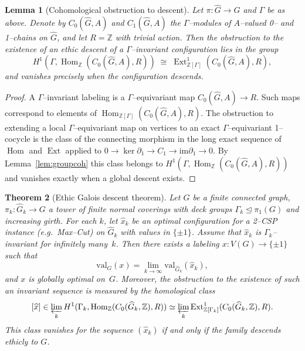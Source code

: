 \documentclass[12pt]{article}
\newcommand{\Hom}{\operatorname{Hom}}
\newcommand{\Ext}{\operatorname{Ext}}
\theoremstyle{plain}
\newtheorem{theorem}{Theorem}[section]
\newtheorem{lemma}[theorem]{Lemma}
\theoremstyle{definition}
\theoremstyle{remark}
\numberwithin{equation}{section}
\begin{document}
\begin{lemma}[Cohomological obstruction to descent]\label{lem:obstruction}
Let $\pi:\widehat G\to G$ and $\Gamma$ be as above.  
Denote by $C_0(\widehat G,A)$ and $C_1(\widehat G,A)$ the $\Gamma$--modules of $A$--valued 0-- and 1--chains on $\widehat G$, and let $R=\mathbb Z$ with trivial action.  
Then the obstruction to the existence of an ethic descent of a $\Gamma$--invariant configuration lies in the group
\[
H^1(\Gamma, \Hom_{\mathbb Z}(C_0(\widehat G,A),R))
\;\cong\;
\Ext^1_{\mathbb Z[\Gamma]}(C_0(\widehat G,A),R),
\]
and vanishes precisely when the configuration descends.
\end{lemma}

\begin{proof}
A $\Gamma$--invariant labeling is a $\Gamma$--equivariant map $C_0(\widehat G,A)\to R$.  
Such maps correspond to elements of $\Hom_{\mathbb Z[\Gamma]}(C_0(\widehat G,A),R)$.  
The obstruction to extending a local $\Gamma$--equivariant map on vertices to an exact $\Gamma$--equivariant 1--cocycle is the class of the connecting morphism in the long exact sequence of $\Hom$ and $\Ext$ applied to $0\to\ker\partial_1\to C_1\to\mathrm{im}\partial_1\to0$.  
By Lemma~\ref{lem:groupcoh} this class belongs to $H^1(\Gamma,\Hom_{\mathbb Z}(C_0(\widehat G,A),R))$ and vanishes exactly when a global descent exists.
\end{proof}

\begin{theorem}[Ethic Galois descent theorem]\label{thm:galois-descent}
Let $G$ be a finite connected graph, $\pi_k:\widehat G_k\to G$ a tower of finite normal coverings with deck groups $\Gamma_k\trianglelefteq\pi_1(G)$ and increasing girth.  
For each $k$, let $\widehat x_k$ be an optimal configuration for a 2--CSP instance (e.g.\ Max--Cut) on $\widehat G_k$ with values in $\{\pm1\}$.  
Assume that $\widehat x_k$ is $\Gamma_k$--invariant for infinitely many~$k$.  
Then there exists a labeling $x:V(G)\to\{\pm1\}$ such that
\[
\mathrm{val}_G(x)=\lim_{k\to\infty}\mathrm{val}_{\widehat G_k}(\widehat x_k),
\]
and $x$ is globally optimal on~$G$.  
Moreover, the obstruction to the existence of such an invariant sequence is measured by the homological class
\[
[\widehat x]\in\varprojlim_k H^1(\Gamma_k,\Hom_{\mathbb Z}(C_0(\widehat G_k,\mathbb Z),R))
\simeq
\varprojlim_k \Ext^1_{\mathbb Z[\Gamma_k]}(C_0(\widehat G_k,\mathbb Z),R).
\]
This class vanishes for the sequence $(\widehat x_k)$ if and only if the family descends ethicly to $G$.
\end{theorem}
\end{document}
